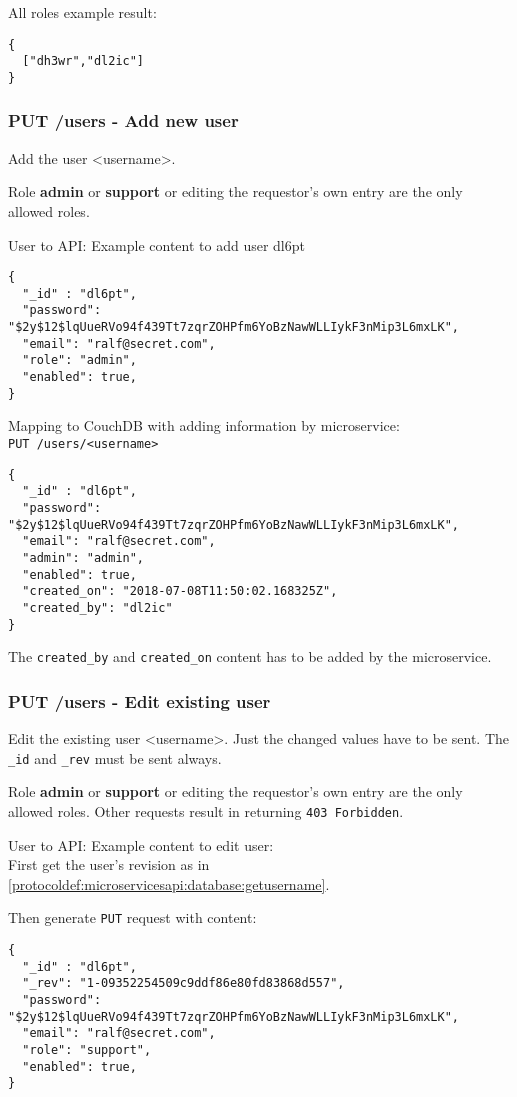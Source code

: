 All roles example result:
\begin{lstlisting}
{
  ["dh3wr","dl2ic"]
}
\end{lstlisting}

\subsubsection{PUT /users - Add new user}
Add the user <username>.

Role \textbf{admin} or \textbf{support} or editing the requestor's own entry are the only allowed roles.

User to API: Example content to add user dl6pt
\begin{lstlisting}
{
  "_id" : "dl6pt",
  "password": "$2y$12$lqUueRVo94f439Tt7zqrZOHPfm6YoBzNawWLLIykF3nMip3L6mxLK",
  "email": "ralf@secret.com",
  "role": "admin",
  "enabled": true,
}
\end{lstlisting}

Mapping to CouchDB with adding information by microservice:\\
\verb|PUT /users/<username>|

\begin{lstlisting}
{
  "_id" : "dl6pt",
  "password": "$2y$12$lqUueRVo94f439Tt7zqrZOHPfm6YoBzNawWLLIykF3nMip3L6mxLK",
  "email": "ralf@secret.com",
  "admin": "admin",
  "enabled": true,
  "created_on": "2018-07-08T11:50:02.168325Z",
  "created_by": "dl2ic"
}
\end{lstlisting}
The \verb|created_by| and \verb|created_on| content has to be added by the microservice.


\subsubsection{PUT /users - Edit existing user}
Edit the existing user <username>. Just the changed values have to be sent. The \verb|_id| and \verb|_rev| must be sent always.

Role \textbf{admin} or \textbf{support} or editing the requestor's own entry are the only allowed roles. Other requests result in returning \verb|403 Forbidden|.

User to API: Example content to edit user:\\
First get the user's revision as in \ref{protocoldef:microservicesapi:database:getusername}.

Then generate \verb|PUT| request with content:
\begin{lstlisting}
{
  "_id" : "dl6pt",
  "_rev": "1-09352254509c9ddf86e80fd83868d557",
  "password": "$2y$12$lqUueRVo94f439Tt7zqrZOHPfm6YoBzNawWLLIykF3nMip3L6mxLK",
  "email": "ralf@secret.com",
  "role": "support",
  "enabled": true,
}
\end{lstlisting}

